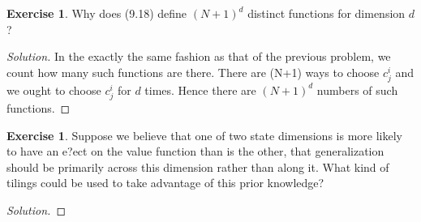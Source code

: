 \documentclass[oneside,11pt]{article}
\theoremstyle{definition}
\newtheorem{exer}[thm]{Exercise}
\newenvironment{solution}
{\renewcommand\qedsymbol{$\blacksquare$}\begin{proof}[Solution]} {\end{proof}}
\begin{document}
\begin{exer}
Why does (9.18) define $(N + 1)^d$ distinct functions for dimension $d$?
\end{exer}

\begin{shaded}
\begin{solution} 
In the exactly the same fashion as that of the previous problem, we count how many such functions are there. There are (N+1) ways to choose $c_j^i$ and we ought to choose $c_j^i$ for $d$ times. Hence there are $(N+1)^d$ numbers of such functions.

\end{solution} 
\end{shaded}

\begin{exer}
Suppose we believe that one of two state dimensions is more likely to have an e?ect on the value function than is the other, that generalization should be primarily across this dimension rather than along it. What kind of tilings could be used to take advantage of this prior knowledge?
\end{exer}

\begin{shaded}
\begin{solution} 


\end{solution} 
\end{shaded}





  
\end{document}
